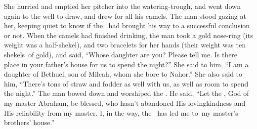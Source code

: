 \begin{inparaenum}
   She hurried and emptied her pitcher into the watering-trough, and went down again to the well to draw, and drew for all his camels.%
   The man stood gazing at her, keeping quiet to know if the \lord\ had brought his way to a successful conclusion or not.%
   When the camels had finished drinking, the man took a gold nose-ring (its weight was a half-shekel), and two bracelets for her hands (their weight was ten shekels\understood{}\ of gold),%
   and said, ``Whose daughter are you? Please tell me. Is there place in your father's house for us to spend the night?''%
   She said to him, ``I am a daughter of Bethuel, son of Milcah, whom she bore to Nahor.''%
   She also said to him, ``There's tons of straw and fodder as well with us, as well as room to spend the night.''%
   The man bowed down and worshiped the \lord.%
   He said, ``Let the \lord, God of my master Abraham, be blessed, who hasn't abandoned His lovingkindness and His reliability from my master. I, in the way, the \lord\ has led me to\understood{}\ my master's brothers' house.''%


\end{inparaenum}
